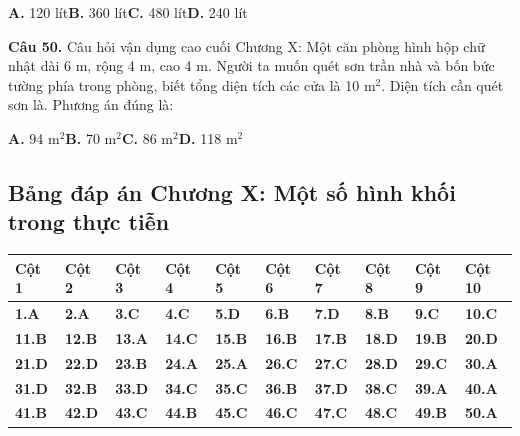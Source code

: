 \documentclass[11pt,a4paper]{article}
\begin{document}
\hspace*{1.5em}\textbf{A.} 120 lít\quad\quad \textbf{B.} 360 lít\quad\quad \textbf{C.} 480 lít\quad\quad \textbf{D.} 240 lít\par\vspace{2pt}
\textbf{\color{primary} Câu 50.} Câu hỏi vận dụng cao cuối Chương X: Một căn phòng hình hộp chữ nhật dài 6 m, rộng 4 m, cao 4 m. Người ta muốn quét sơn trần nhà và bốn bức tường phía trong phòng, biết tổng diện tích các cửa là 10 m$^2$. Diện tích cần quét sơn là. Phương án đúng là:\par
\hspace*{1.5em}\textbf{A.} 94 m$^2$\quad\quad \textbf{B.} 70 m$^2$\quad\quad \textbf{C.} 86 m$^2$\quad\quad \textbf{D.} 118 m$^2$\par\vspace{2pt}
\subsection*{\color{primary} Bảng đáp án Chương X: Một số hình khối trong thực tiễn}
\begin{center}
\renewcommand{\arraystretch}{1.25}
\begin{tabularx}{\textwidth}{*{10}{>{\centering\arraybackslash}X}}
\toprule
\textbf{\color{primary} Cột 1} & \textbf{\color{primary} Cột 2} & \textbf{\color{primary} Cột 3} & \textbf{\color{primary} Cột 4} & \textbf{\color{primary} Cột 5} & \textbf{\color{primary} Cột 6} & \textbf{\color{primary} Cột 7} & \textbf{\color{primary} Cột 8} & \textbf{\color{primary} Cột 9} & \textbf{\color{primary} Cột 10} \\
\midrule
\textbf{1.A} & \textbf{2.A} & \textbf{3.C} & \textbf{4.C} & \textbf{5.D} & \textbf{6.B} & \textbf{7.D} & \textbf{8.B} & \textbf{9.C} & \textbf{10.C} \\
\rowcolor{rowtint} \textbf{11.B} & \textbf{12.B} & \textbf{13.A} & \textbf{14.C} & \textbf{15.B} & \textbf{16.B} & \textbf{17.B} & \textbf{18.D} & \textbf{19.B} & \textbf{20.D} \\
\textbf{21.D} & \textbf{22.D} & \textbf{23.B} & \textbf{24.A} & \textbf{25.A} & \textbf{26.C} & \textbf{27.C} & \textbf{28.D} & \textbf{29.C} & \textbf{30.A} \\
\rowcolor{rowtint} \textbf{31.D} & \textbf{32.B} & \textbf{33.D} & \textbf{34.C} & \textbf{35.C} & \textbf{36.B} & \textbf{37.D} & \textbf{38.C} & \textbf{39.A} & \textbf{40.A} \\
\textbf{41.B} & \textbf{42.D} & \textbf{43.C} & \textbf{44.B} & \textbf{45.C} & \textbf{46.C} & \textbf{47.C} & \textbf{48.C} & \textbf{49.B} & \textbf{50.A} \\
\bottomrule
\end{tabularx}
\end{center}\vspace{10pt}
\end{document}
